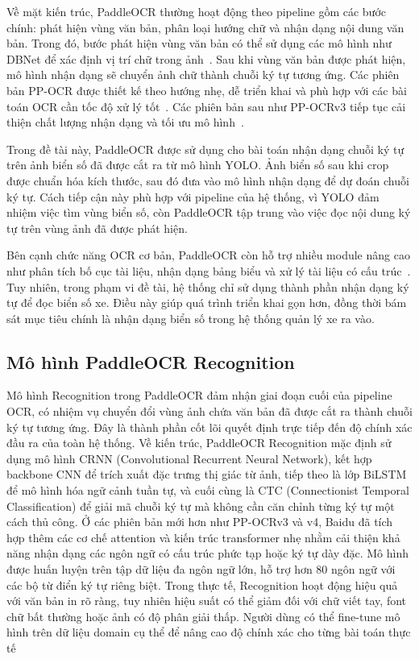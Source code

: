 \documentclass[13pt,a4paper]{report}
\begin{document}
Về mặt kiến trúc, PaddleOCR thường hoạt động theo pipeline gồm các bước chính: phát hiện vùng văn bản, phân loại hướng chữ và nhận dạng nội dung văn bản. Trong đó, bước phát hiện vùng văn bản có thể sử dụng các mô hình như DBNet để xác định vị trí chữ trong ảnh~\cite{liao2019dbnet}. Sau khi vùng văn bản được phát hiện, mô hình nhận dạng sẽ chuyển ảnh chữ thành chuỗi ký tự tương ứng. Các phiên bản PP-OCR được thiết kế theo hướng nhẹ, dễ triển khai và phù hợp với các bài toán OCR cần tốc độ xử lý tốt~\cite{du2020ppocr}. Các phiên bản sau như PP-OCRv3 tiếp tục cải thiện chất lượng nhận dạng và tối ưu mô hình~\cite{li2022ppocrv3}.

Trong đề tài này, PaddleOCR được sử dụng cho bài toán nhận dạng chuỗi ký tự trên ảnh biển số đã được cắt ra từ mô hình YOLO. Ảnh biển số sau khi crop được chuẩn hóa kích thước, sau đó đưa vào mô hình nhận dạng để dự đoán chuỗi ký tự. Cách tiếp cận này phù hợp với pipeline của hệ thống, vì YOLO đảm nhiệm việc tìm vùng biển số, còn PaddleOCR tập trung vào việc đọc nội dung ký tự trên vùng ảnh đã được phát hiện.

Bên cạnh chức năng OCR cơ bản, PaddleOCR còn hỗ trợ nhiều module nâng cao như phân tích bố cục tài liệu, nhận dạng bảng biểu và xử lý tài liệu có cấu trúc~\cite{paddleocr_docs}. Tuy nhiên, trong phạm vi đề tài, hệ thống chỉ sử dụng thành phần nhận dạng ký tự để đọc biển số xe. Điều này giúp quá trình triển khai gọn hơn, đồng thời bám sát mục tiêu chính là nhận dạng biển số trong hệ thống quản lý xe ra vào.

\subsection{Mô hình PaddleOCR Recognition}

Mô hình Recognition trong PaddleOCR đảm nhận giai đoạn cuối của pipeline OCR, có nhiệm vụ chuyển đổi vùng ảnh chứa văn bản đã được cắt ra thành chuỗi ký tự tương ứng. Đây là thành phần cốt lõi quyết định trực tiếp đến độ chính xác đầu ra của toàn hệ thống.
Về kiến trúc, PaddleOCR Recognition mặc định sử dụng mô hình CRNN (Convolutional Recurrent Neural Network), kết hợp backbone CNN để trích xuất đặc trưng thị giác từ ảnh, tiếp theo là lớp BiLSTM để mô hình hóa ngữ cảnh tuần tự, và cuối cùng là CTC (Connectionist Temporal Classification) để giải mã chuỗi ký tự mà không cần căn chỉnh từng ký tự một cách thủ công. Ở các phiên bản mới hơn như PP-OCRv3 và v4, Baidu đã tích hợp thêm các cơ chế attention và kiến trúc transformer nhẹ nhằm cải thiện khả năng nhận dạng các ngôn ngữ có cấu trúc phức tạp hoặc ký tự dày đặc.
Mô hình được huấn luyện trên tập dữ liệu đa ngôn ngữ lớn, hỗ trợ hơn 80 ngôn ngữ với các bộ từ điển ký tự riêng biệt. Trong thực tế, Recognition hoạt động hiệu quả với văn bản in rõ ràng, tuy nhiên hiệu suất có thể giảm đối với chữ viết tay, font chữ bất thường hoặc ảnh có độ phân giải thấp. Người dùng có thể fine-tune mô hình trên dữ liệu domain cụ thể để nâng cao độ chính xác cho từng bài toán thực tế
\end{document}
